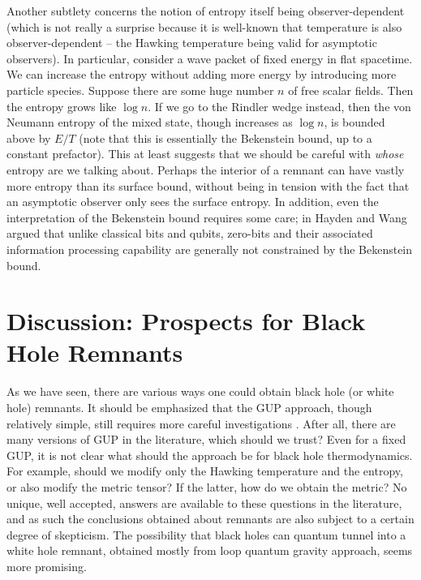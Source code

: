 \documentclass[12pt,preprintnumbers, floatfix, preprintnumbers, letterpaper, superscriptaddress,nofootinbib]{revtex4-2}
\begin{document}
Another subtlety concerns the notion of entropy itself being observer-dependent (which is not really a surprise because it is well-known that temperature is also observer-dependent -- the Hawking temperature being valid for asymptotic observers). In particular, consider a wave packet of fixed energy in flat spacetime. We can increase the entropy without adding more energy by introducing more particle species. Suppose there are some huge number $n$ of free scalar fields. Then the entropy grows like $\log n$. If we go to the Rindler wedge instead, then the von Neumann entropy of the mixed state, though increases as $\log n$, is bounded above by $E/T$ \cite{0310022} (note that this is essentially the Bekenstein bound, up to a constant prefactor). This at least suggests that we should be careful with \emph{whose} entropy are we talking about. Perhaps the interior of a remnant can have vastly more entropy than its surface bound, without being in tension with the fact that an asymptotic observer only sees the surface entropy. In addition, even the interpretation of the Bekenstein bound requires some care; in \cite{2309.07436} Hayden and Wang argued that unlike classical bits and qubits, zero-bits and their associated information processing capability are generally not constrained by the Bekenstein bound. 

\section{Discussion: Prospects for Black Hole Remnants}

As we have seen, there are various ways one could obtain black hole (or white hole) remnants. It should be emphasized that the GUP approach, though relatively simple, still requires more careful investigations \cite{2005.12075,2303.10719,2305.16193}. After all, there are many versions of GUP in the literature, which should we trust? Even for a fixed GUP, it is not clear what should the approach be for black hole thermodynamics. For example, should we modify only the Hawking temperature and the entropy, or also modify the metric tensor? If the latter, how do we obtain the metric? No unique, well accepted, answers are available to these questions in the literature, and as such the conclusions obtained about remnants are also subject to a certain degree of skepticism. The possibility that black holes can quantum tunnel into a white hole remnant, obtained mostly from loop quantum gravity approach, seems more promising.
\end{document}
